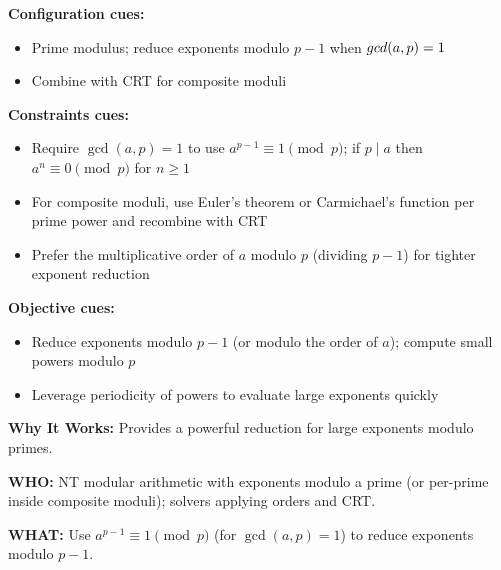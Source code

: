 \documentclass[12pt]{article}
\begin{document}
\textbf{Configuration cues:}
\begin{itemize}
    \item Prime modulus; reduce exponents modulo $p-1$ when $\\gcd(a,p)=1$
    \item Combine with CRT for composite moduli
\end{itemize}

\textbf{Constraints cues:}
\begin{itemize}
    \item Require $\gcd(a,p)=1$ to use $a^{p-1} \equiv 1 \pmod p$; if $p\mid a$ then $a^n \equiv 0 \pmod p$ for $n\ge 1$
    \item For composite moduli, use Euler's theorem or Carmichael's function per prime power and recombine with CRT
    \item Prefer the multiplicative order of $a$ modulo $p$ (dividing $p-1$) for tighter exponent reduction
\end{itemize}

\textbf{Objective cues:}
\begin{itemize}
    \item Reduce exponents modulo $p-1$ (or modulo the order of $a$); compute small powers modulo $p$
    \item Leverage periodicity of powers to evaluate large exponents quickly
\end{itemize}

\textbf{Why It Works:} Provides a powerful reduction for large exponents modulo primes.

\textbf{WHO:} NT modular arithmetic with exponents modulo a prime (or per-prime inside composite moduli); solvers applying orders and CRT.

\textbf{WHAT:} Use $a^{p-1} \equiv 1 \pmod p$ (for $\gcd(a,p)=1$) to reduce exponents modulo $p-1$.
\end{document}
